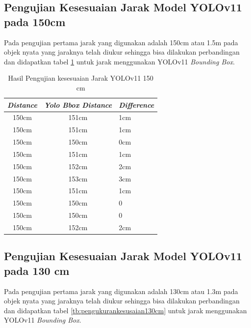 \subsection{Pengujian Kesesuaian Jarak Model YOLOv11 pada 150cm}

Pada pengujian pertama jarak yang digunakan adalah 150cm atau 1.5m pada objek nyata yang jaraknya telah diukur sehingga bisa dilakukan perbandingan dan didapatkan tabel \ref{tb:pengukurankesusaian150cm} untuk jarak menggunakan YOLOv11 \emph{Bounding Box}.

\begin{table}[H]
  \centering
  \caption{Hasil Pengujian kesesuaian Jarak YOLOv11 150 cm}
  \label{tb:pengukurankesusaian150cm}
    \begin{tabular}{|c|c|l|}
    \hline
    \textit{Distance} & \textit{Yolo Bbox Distance} & \textit{Difference} \\ \hline
    150cm             & 151cm                       & 1cm                 \\ \hline
    150cm             & 151cm                       & 1cm                 \\ \hline
    150cm             & 150cm                       & 0cm                 \\ \hline
    150cm             & 151cm                       & 1cm                 \\ \hline
    150cm             & 152cm                       & 2cm                 \\ \hline
    150cm             & 153cm                       & 3cm                 \\ \hline
    150cm             & 151cm                       & 1cm                 \\ \hline
    150cm             & 150cm                       & 0                   \\ \hline
    150cm             & 150cm                       & 0                   \\ \hline
    150cm             & 152cm                       & 2cm                 \\ \hline
  \end{tabular}
\end{table}

  \subsection{Pengujian Kesesuaian Jarak Model YOLOv11 pada 130 cm}

  Pada pengujian pertama jarak yang digunakan adalah 130cm atau 1.3m pada objek nyata yang jaraknya telah diukur sehingga bisa dilakukan perbandingan dan didapatkan tabel \ref{tb:pengukurankesusaian130cm} untuk jarak menggunakan YOLOv11 \emph{Bounding Box}.
  
